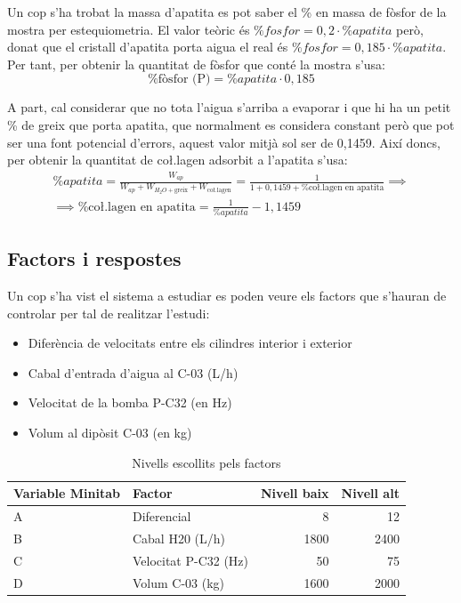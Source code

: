 \documentclass[a4paper]{article}
\begin{document}
Un cop s'ha trobat la massa d'apatita es pot saber el \% en massa de fòsfor de la mostra per estequiometria. El valor teòric és $\% fosfor = 0,2 \cdot \% apatita$ però, donat que el cristall d'apatita porta aigua el real és $\% fosfor = 0,185 \cdot \% apatita$. Per tant, per obtenir la quantitat de fòsfor que conté la mostra s'usa:
$$
\boxed{\% \text{fòsfor (P)} = \% apatita \cdot 0,185}
$$

A part, cal considerar que no tota l'aigua s'arriba a evaporar i que hi ha un petit \% de greix que porta apatita, que normalment es considera constant però que pot ser una font potencial d'errors, aquest valor mitjà sol ser de 0,1459. Així doncs, per obtenir la quantitat de co\l.lagen adsorbit a l'apatita s'usa:
\begin{gather*}
	\% apatita =
	\frac{W_{ap}}{W_{ap} + W_{H_2O + \text{greix}} + W_{\text{co\l.lagen}}} =
	\frac{1}{1 + 0,1459 + \% \text{co\l.lagen en apatita}} \implies \\
	\implies 
	\boxed{\% \text{co\l.lagen en apatita} = \frac{1}{\% apatita} - 1,1459}
\end{gather*}

\subsection{Factors i respostes}

Un cop s'ha vist el sistema a estudiar es poden veure els factors que s'hauran de controlar per tal de realitzar l'estudi:

\begin{itemize}
	\item Diferència de velocitats entre els cilindres interior i exterior
	\item Cabal d'entrada d'aigua al C-03 (L/h)
	\item Velocitat de la bomba P-C32 (en Hz)
	\item Volum al dipòsit C-03 (en kg)
\end{itemize}

\begin{table}[H]
	\centering
	\begin{tabular}{ l | l | r | r }
		\rowcolor{gray!60}
		Variable Minitab & Factor & Nivell baix & Nivell alt \\ \hline
		A & Diferencial & 8 & 12 \\
		B & Cabal H20 (L/h)& 1800 & 2400 \\
		C & Velocitat P-C32 (Hz) & 50 & 75 \\
		D & Volum C-03 (kg) & 1600 & 2000 \\
	\end{tabular}
	\caption{Nivells escollits pels factors}
\end{table}
\end{document}
